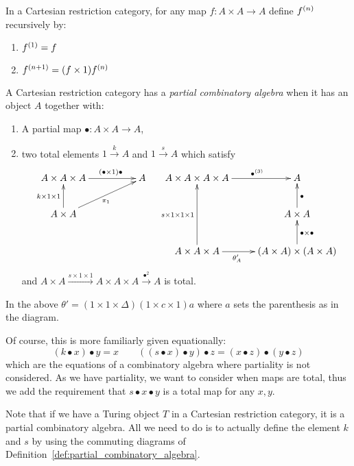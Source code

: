 \begin{notation}\label{not:multi-self-map}
  In a Cartesian restriction category, for any map $f:A\times A\to A$ define ${f}^{(n)}$
  recursively by:
  \begin{enumerate}[{(}i{)}]
  \item ${f}^{(1)} = f$
  \item ${f}^{(n+1)} = (f\times 1) {f}^{(n)}$
  \end{enumerate}
\end{notation}
\begin{definition}\label{def:partial_combinatory_algebra}
  A Cartesian restriction category has a \emph{partial combinatory algebra} when it has an object
  $A$ together with:
  \begin{enumerate}[{(}i{)}]
  \item A partial map $\bullet:A\times A \to A$,
  \item two total elements $1\xrightarrow{k}A$ and $1\xrightarrow{s}{A}$ which satisfy
    \[
      \xymatrix@C+25pt{
        A\times A\times A \ar[r]^(.6){(\bullet\times 1)\bullet} & A\\
        A\times A \ar[u]^{k\times1\times1} \ar[ur]_{\pi_1}
      }\quad
      \xymatrix{
        A\times A\times A\times A \ar[r]^(.6){\multibullet{3}}&A\\
        &A\times A \ar[u]_{\bullet}\\
        A\times A\times A \ar[uu]^{s\times1\times1\times1} \ar[r]_(.4){\theta_A'}
          & (A\times A) \times (A\times A) \ar[u]_{\bullet\times\bullet}
      }
    \]
    and $A\times A \xrightarrow{s\times1\times1} A\times A\times A \xrightarrow{\bullet^2} A$ is total.
  \end{enumerate}
  In the above $\theta' = (1\times1\times\Delta)(1\times c \times 1)a$ where $a$ sets the
  parenthesis as in the diagram.
\end{definition}

Of course, this is more familiarly given equationally:
\[
   (k\bullet x)\bullet y = x \qquad ((s\bullet x)\bullet y) \bullet z = (x\bullet z) \bullet
   (y\bullet z)
\]
which are the equations of a combinatory algebra where partiality is not considered. As we have
partiality, we want to consider when maps are total, thus we add the requirement that
$s\bullet x\bullet y$ is a
total map for any $x,y$.

Note that if we have a Turing object $T$ in a Cartesian restriction category, it is a partial
combinatory algebra. All we need to do is to actually define the element $k$ and $s$ by using the
commuting diagrams of Definition~\ref{def:partial_combinatory_algebra}.

